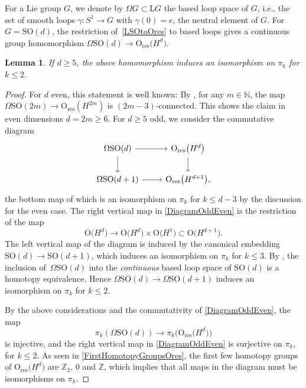 \documentclass[pdftex]{sigma}
\numberwithin{equation}{section}
\newtheorem{Lemma}[Theorem]{Lemma}
\newcommand{\N}{\mathbb{N}}
\newcommand{\Z}{\mathbb{Z}}
\newcommand{\SO}{\mathrm{SO}}
\newcommand{\res}{\mathrm{res}}
\renewcommand{\O}{\mathrm{O}}
\renewcommand{\L}{\mathrm{L}}
\begin{document}
For a Lie group $G$, we denote by $\Omega G \subset \L G$ the based loop space of $G$, i.e., the set of smooth loops $\gamma\colon S^1 \to G$ with $\gamma(0) = e$, the neutral element of $G$.
For $G = \SO(d)$, the restriction of~\eqref{LSOtoOres} to based loops gives a continuous group homomorphism $\Omega \SO(d) \longrightarrow \O_{\res}\big(H^d\big)$.

\begin{Lemma} \label{LemmaPi2Iso}
If $d \geq 5$, the above homomorphism induces an isomorphism on $\pi_k$ for $k \leq 2$.
\end{Lemma}

\begin{proof}
For $d$ even, this statement is well known: By \cite[Proposition~12.5.2]{PressleySegal}, for any $m \in \N$, the map $\Omega\SO(2m) \to \O_{\res}(H^{2m})$ is $(2m-3)$-connected.
This shows the claim in even dimensions $d=2m \geq 6$.
For $d \geq 5$ odd, we consider the commutative diagram
\begin{equation} \label{DiagramOddEven}
\begin{tikzcd}
\Omega\SO(d) \ar[d] \ar[r] & \O_{\res}\big(H^d\big) \ar[d] \\
\Omega\SO(d+1) \ar[r] & \O_{\res}\big(H^{d+1}\big),
\end{tikzcd}
\end{equation}
the bottom map of which is an isomorphism on $\pi_k$ for $k \leq d-3$ by the discussion for the even case.
The right vertical map in \eqref{DiagramOddEven} is the restriction of the map
\[\O\big(H^d\big) \to \O\big(H^d\big) \times \O\big(H^1\big) \subset \O\big(H^{d+1}\big).\]
 The left vertical map of the diagram is induced by the canonical embedding $\SO(d) \to \SO(d+1)$, which induces an isomorphism on $\pi_k$ for $k \leq 3$. By \cite[Proposition~7.1]{CareyCrowleyMurray}, the inclusion of~$\Omega \SO(d)$ into the \emph{continuous} based loop space of $\SO(d)$ is a homotopy equivalence. Hence $\Omega \SO(d) \to \Omega\SO(d+1)$ induces an isomorphism on $\pi_k$ for $k \leq 2$.

By the above considerations and the commutativity of \eqref{DiagramOddEven}, the map \[\pi_k(\Omega\SO(d)) \to \pi_k\big(\O_{\res}\big(H^d\big)\big)\]
 is injective, and the right vertical map in \eqref{DiagramOddEven} is surjective on $\pi_k$, for $k \leq 2$.
As seen in \eqref{FirstHomotopyGroupsOres}, the first few homotopy groups of $\O_{\res}\big(H^d\big)$ are $\Z_2$, $0$ and $\Z$, which implies that all maps in the diagram must be isomorphisms on $\pi_k$.
\end{proof}
\end{document}
